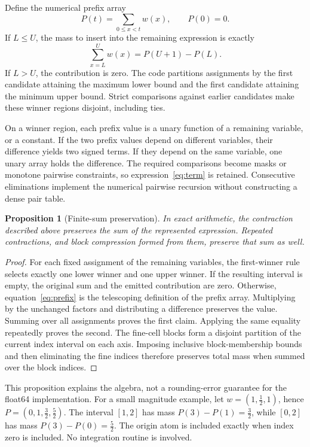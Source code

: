 \documentclass[12pt,a4paper]{article}
\newtheorem{proposition}{Proposition}
\begin{document}
Define the numerical prefix array
\[
 P(t)=\sum_{0\le x<t}w(x),\qquad P(0)=0.
\]
If $L\le U$, the mass to insert into the remaining expression is exactly
\begin{equation}
 \sum_{x=L}^{U}w(x)=P(U+1)-P(L).
 \label{eq:prefix}
\end{equation}
If $L>U$, the contribution is zero. The code partitions assignments by the
first candidate attaining the maximum lower bound and the first candidate
attaining the minimum upper bound. Strict comparisons against earlier
candidates make these winner regions disjoint, including ties.

On a winner region, each prefix value is a unary function of a remaining
variable, or a constant. If the two prefix values depend on different variables,
their difference yields two signed terms. If they depend on the same variable,
one unary array holds the difference. The required comparisons become masks
or monotone pairwise constraints, so expression~\eqref{eq:term} is retained.
Consecutive eliminations implement the numerical pairwise recursion without
constructing a dense pair table.

\begin{proposition}[Finite-sum preservation]
In exact arithmetic, the contraction described above preserves the sum of
the represented expression. Repeated contractions, and block compression
formed from them, preserve that sum as well.
\end{proposition}
\begin{proof}
For each fixed assignment of the remaining variables, the first-winner rule
selects exactly one lower winner and one upper winner. If the resulting interval
is empty, the original sum and the emitted contribution are zero. Otherwise,
equation~\eqref{eq:prefix} is the telescoping definition of the prefix array.
Multiplying by the unchanged factors and distributing a difference preserves
the value. Summing over all assignments proves the first claim. Applying the
same equality repeatedly proves the second. The fine-cell blocks form a
disjoint partition of the current index interval on each axis. Imposing
inclusive block-membership bounds and then eliminating the fine indices
therefore preserves total mass when summed over the block indices.
\end{proof}

This proposition explains the algebra, not a rounding-error guarantee for
the float64 implementation. For a small magnitude example, let
$w=(1,\tfrac12,1)$, hence $P=(0,1,\tfrac32,\tfrac52)$. The interval
$[1,2]$ has mass $P(3)-P(1)=\tfrac32$, while $[0,2]$ has mass
$P(3)-P(0)=\tfrac52$. The origin atom is included exactly when index zero
is included. No integration routine is involved.
\end{document}
